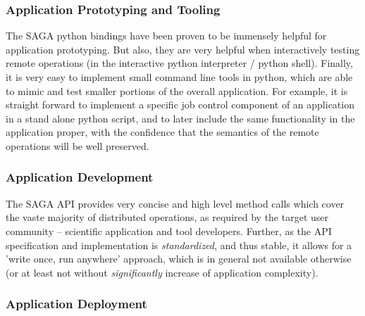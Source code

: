 \documentclass[12pt]{article}
\newcommand{\I}[1]{\textit{#1}}
\begin{document}
\subsubsection*{Application Prototyping and Tooling}

   The SAGA python bindings have been proven to be immensely helpful
   for application prototyping.  But also, they are very helpful when
   interactively testing remote operations (in the interactive python
   interpreter / python shell).  Finally, it is very easy to implement
   small command line tools in python, which are able to mimic and
   test smaller portions of the overall application.  For example, it
   is straight forward to implement a specific job control component
   of an application in a stand alone python script, and to later
   include the same functionality in the application proper, with the
   confidence that the semantics of the remote operations will be well
   preserved. %


 \subsubsection*{Application Development}


  The SAGA API provides very concise and high level method calls which
  cover the vaste majority of distributed operations, as required by
  the target user community -- scientific application and tool
  developers.  Further, as the API specification and implementation is
  \I{standardized}, and thus stable, it allows for a 'write once, run
  anywhere' approach, which is in general not available otherwise (or
  at least not without \I{significantly} increase of application
  complexity).

\subsubsection*{Application Deployment}
\end{document}
